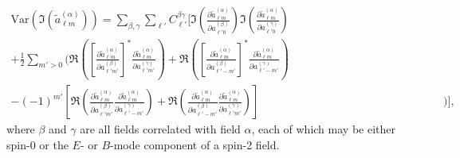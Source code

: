 \begin{equation}
\begin{split}
\mathrm{Var} \left(
\Im \left( \widetilde{a}_{\ell m}^{ \left( \alpha \right) } \right)
\right) =
\sum_{\beta, \gamma}
\sum_{\ell'}
C_{\ell'}^{\beta \gamma}
\Bigg[
\Im \left(
\frac{\partial \widetilde{a}_{\ell m}^{ \left( \alpha \right) }}
{\partial a_{\ell' 0}^{ \left( \beta \right) }}
\right)
\Im \left(
\frac{\partial \widetilde{a}_{\ell m}^{ \left( \alpha \right) }}
{\partial a_{\ell' 0}^{ \left( \gamma \right) }}
\right)
\qquad\qquad\qquad\qquad\qquad\qquad\quad & \\
+ \frac{1}{2}
\sum_{m' > 0} \Bigg(
\Re \left(
\left[
\frac{\partial \widetilde{a}_{\ell m}^{ \left( \alpha \right) }}
{\partial a_{\ell' m'}^{ \left( \beta \right) }}
\right]^*
\frac{\partial \widetilde{a}_{\ell m}^{ \left( \alpha \right) }}
{\partial a_{\ell' m'}^{ \left( \gamma \right) }}
\right)
+ \Re \left(
\left[
\frac{\partial \widetilde{a}_{\ell m}^{ \left( \alpha \right) }}
{\partial a_{\ell' -m'}^{ \left( \beta \right) }}
\right]^*
\frac{\partial \widetilde{a}_{\ell m}^{ \left( \alpha \right) }}
{\partial a_{\ell' -m'}^{ \left( \gamma \right) }}
\right)& \\
-
\left( -1 \right)^{m'} \left[
\Re \left(
\frac{\partial \widetilde{a}_{\ell m}^{ \left( \alpha \right) }}
{\partial a_{\ell' m'}^{ \left( \beta \right) }}
\frac{\partial \widetilde{a}_{\ell m}^{ \left( \alpha \right) }}
{\partial a_{\ell' -m'}^{ \left( \gamma \right) }}
\right)
+ \Re \left(
\frac{\partial \widetilde{a}_{\ell m}^{ \left( \alpha \right) }}
{\partial a_{\ell' -m'}^{ \left( \beta \right) }}
\frac{\partial \widetilde{a}_{\ell m}^{ \left( \alpha \right) }}
{\partial a_{\ell' m'}^{ \left( \gamma \right) }}
\right) \right]&
\Bigg) \Bigg],
\label{el_Eqn:im_alm_variance}
\end{split}
\end{equation}
where $\beta$ and $\gamma$ are all fields correlated with field $\alpha$, each of which may be either spin-0 or the $E$- or $B$-mode component of a spin-2 field.

